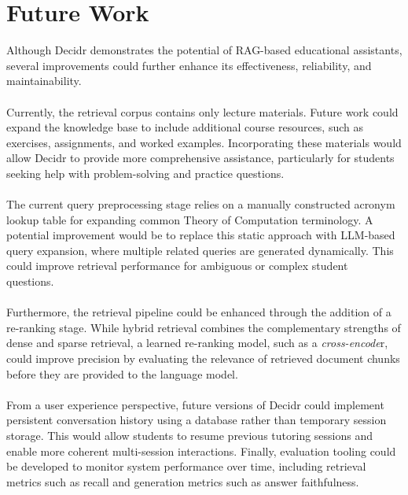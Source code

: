 \documentclass[12pt, a4paper]{report}
\begin{document}
\section{Future Work}
Although Decidr demonstrates the potential of RAG-based educational assistants, several improvements could further enhance its effectiveness, reliability, and maintainability.~\\~\\
Currently, the retrieval corpus contains only lecture materials. Future work could expand the knowledge base to include additional course resources, such as exercises, assignments, and worked examples. Incorporating these materials would allow Decidr to provide more comprehensive assistance, particularly for students seeking help with problem-solving and practice questions.~\\~\\
The current query preprocessing stage relies on a manually constructed acronym lookup table for expanding common Theory of Computation terminology. A potential improvement would be to replace this static approach with LLM-based query expansion, where multiple related queries are generated dynamically. This could improve retrieval performance for ambiguous or complex student questions.~\\~\\
Furthermore, the retrieval pipeline could be enhanced through the addition of a re-ranking stage. While hybrid retrieval combines the complementary strengths of dense and sparse retrieval, a learned re-ranking model, such as a \textit{cross-encode}r, could improve precision by evaluating the relevance of retrieved document chunks before they are provided to the language model.~\\~\\
From a user experience perspective, future versions of Decidr could implement persistent conversation history using a database rather than temporary session storage. This would allow students to resume previous tutoring sessions and enable more coherent multi-session interactions. Finally, evaluation tooling could be developed to monitor system performance over time, including retrieval metrics such as recall and generation metrics such as answer faithfulness.
\end{document}
